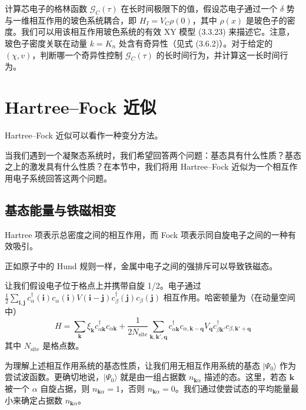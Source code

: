 计算芯电子的格林函数 $\mathcal{G}_C(\tau)$ 在长时间极限下的值，假设芯电子通过一个 $\delta$ 势与一维相互作用的玻色系统耦合，即 $H_I=V_C\rho(0)$，其中 $\rho(x)$ 是玻色子的密度。我们可以用该相互作用玻色系统的有效 XY 模型 (3.3.23) 来描述它。注意，玻色子密度关联在动量 $k=K_n$ 处含有奇异性（见式 (3.6.2)）。对于给定的 $(\chi,v)$，判断哪一个奇异性控制 $\mathcal{G}_C(\tau)$ 的长时间行为，并计算这一长时间行为。

\section{Hartree--Fock 近似}

\begin{keypoints}
\item Hartree--Fock 近似可以看作一种变分方法。
\end{keypoints}

当我们遇到一个凝聚态系统时，我们希望回答两个问题：基态具有什么性质？基态之上的激发具有什么性质？在本节中，我们将用 Hartree--Fock 近似为一个相互作用电子系统回答这两个问题。

\subsection{基态能量与铁磁相变}

\begin{keypoints}
\item Hartree 项表示总密度之间的相互作用，而 Fock 项表示同自旋电子之间的一种有效吸引。
\item 正如原子中的 Hund 规则一样，金属中电子之间的强排斥可以导致铁磁态。
\end{keypoints}

让我们假设电子位于格点上并携带自旋 1/2。电子通过 $\frac{1}{2}\sum_{\pmb{i},\pmb{j}}c_{\alpha}^{\dagger}(\pmb{i})c_{\alpha}(\pmb{i})V(\pmb{i}-\pmb{j})c_{\beta}^{\dagger}(\pmb{j})c_{\beta}(\pmb{j})$ 相互作用。哈密顿量为（在动量空间中）
\begin{equation*}
H=\sum_{\pmb{k}}\xi_{\pmb{k}}c_{\alpha\pmb{k}}^{\dagger}c_{\alpha\pmb{k}}+\frac{1}{2N_{\mathrm{site}}}\sum_{\pmb{k},\pmb{k}',\pmb{q}}c_{\alpha\pmb{k}}^{\dagger}c_{\alpha,\pmb{k}-\pmb{q}}V_{\pmb{q}}c_{\beta\pmb{k}'}^{\dagger}c_{\beta,\pmb{k}'+\pmb{q}}\tag{5.2.1}
\end{equation*}
其中 $N_{\mathrm{site}}$ 是格点数。

为理解上述相互作用系统的基态性质，让我们用无相互作用系统的基态 $|\Psi_0\rangle$ 作为尝试波函数。更确切地说，$|\Psi_0\rangle$ 就是由一组占据数 $n_{\pmb{k}\alpha}$ 描述的态。这里，若态 $\pmb{k}$ 被一个 $\alpha$ 自旋占据，则 $n_{\pmb{k}\alpha}=1$，否则 $n_{\pmb{k}\alpha}=0$。我们通过使尝试态的平均能量最小来确定占据数 $n_{\pmb{k}\alpha}$。

